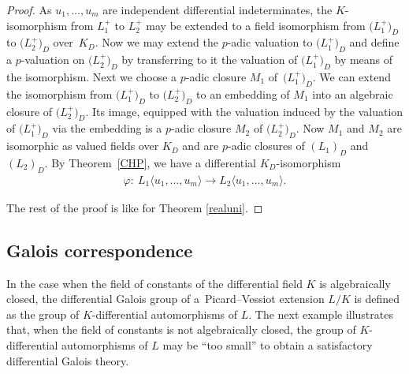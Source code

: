 \documentclass[10pt,a4paper]{amsart}
\numberwithin{equation}{section}
\begin{document}
\begin{proof} As $u_1,\dots,u_m$ are independent differential indeterminates, the $K$-isomorphism from $L_1^+$ to $L_2^+$ may be extended to a field isomorphism from $\big(L_1^+\big)_D$ to $\big(L_2^+\big)_D$ over~$K_D$. Now we may extend the $p$-adic valuation to $\big(L_1^+\big)_D$ and define a $p$-valuation on $\big(L_2^+\big)_D$ by transferring to it the valuation of $\big(L_1^+\big)_D$ by means of the isomorphism.
Next we choose a $p$-adic closure $M_1$ of~$\big(L_1^+\big)_D$. We can extend the isomorphism from $\big(L_1^+\big)_D$ to $\big(L_2^+\big)_D$ to an embedding of $M_1$ into an algebraic closure of $\big(L_2^+\big)_D$. Its image, equipped with the valuation induced by the valuation of $\big(L_1^+\big)_D$ via the embedding is a $p$-adic closure $M_2$ of $\big(L_2^+\big)_D$. Now $M_1$ and $M_2$ are isomorphic as valued fields over $K_D$ and are $p$-adic closures of $(L_1)_D$ and $(L_2)_D$. By Theorem~\ref{CHP}, we have a differential $K_D$-isomorphism
\begin{gather*}
\varphi\colon\ L_1\langle u_1,\dots,u_m \rangle \rightarrow L_2\langle u_1,\dots,u_m \rangle.
\end{gather*}

The rest of the proof is like for Theorem \ref{realuni}.
\end{proof}

\subsection{Galois correspondence}

In the case when the field of constants of the differential field $K$ is algebraically closed, the dif\-fe\-ren\-tial Galois group of a~Picard--Vessiot extension $L/K$ is defined as the group of $K$-differential automorphisms of $L$. The next example illustrates that, when the field of constants is not algebraically closed, the group of $K$-differential automorphisms of $L$ may be ``too small'' to obtain a satisfactory differential Galois theory.
\end{document}
